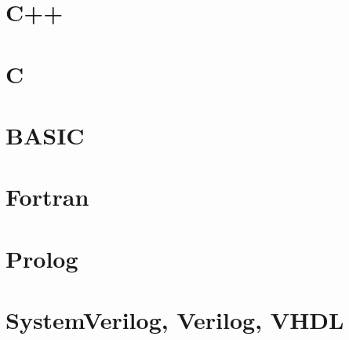 \documentclass[letterpaper,12pt]{book}
\begin{document}
    \section{C++}

    \section{C}

    \section{BASIC}

    \section{Fortran}

    \section{Prolog}

    \section{SystemVerilog, Verilog, VHDL}
    \label{app:installations:HDL}
\end{document}

